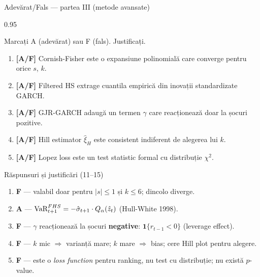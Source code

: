 \documentclass[9pt, aspectratio=169, t]{beamer}
\begin{document}
\begin{frame}[shrink=10]{Adevărat/Fals --- partea III (metode avansate)}
\begin{cminipage}{0.95\textwidth}
\begin{block}{Marcați A (adevărat) sau F (fals). Justificați.}
\begin{enumerate}\setlength{\itemsep}{0pt}
    \item[11.] \textbf{[A/F]} Cornish-Fisher este o expansiune polinomială care converge pentru orice $s$, $k$.
    \item[12.] \textbf{[A/F]} Filtered HS extrage cuantila empirică din inovații standardizate GARCH.
    \item[13.] \textbf{[A/F]} GJR-GARCH adaugă un termen $\gamma$ care reacționează doar la șocuri pozitive.
    \item[14.] \textbf{[A/F]} Hill estimator $\hat{\xi}_H$ este consistent indiferent de alegerea lui $k$.
    \item[15.] \textbf{[A/F]} Lopez loss este un test statistic formal cu distribuție $\chi^2$.
\end{enumerate}
\end{block}
\begin{exampleblock}{Răspunsuri și justificări (11--15)}
\begin{enumerate}\setlength{\itemsep}{0pt}
    \item[11.] \textbf{F} --- valabil doar pentru $|s| \leq 1$ și $k \leq 6$; dincolo diverge.
    \item[12.] \textbf{A} --- $\text{VaR}^{FHS}_{t+1} = -\hat{\sigma}_{t+1} \cdot Q_\alpha(\hat{z}_t)$ (Hull-White 1998).
    \item[13.] \textbf{F} --- $\gamma$ reacționează la șocuri \textbf{negative}: $\mathbf{1}\{r_{t-1} < 0\}$ (leverage effect).
    \item[14.] \textbf{F} --- $k$ mic $\Rightarrow$ varianță mare; $k$ mare $\Rightarrow$ bias; cere Hill plot pentru alegere.
    \item[15.] \textbf{F} --- este o \emph{loss function} pentru ranking, nu test cu distribuție; nu există $p$-value.
\end{enumerate}
\end{exampleblock}
\end{cminipage}
\end{frame}

\end{document}
